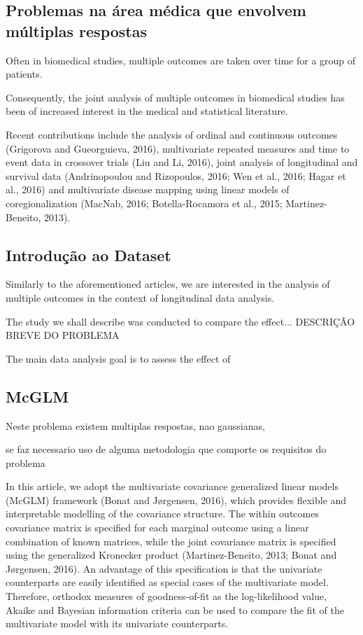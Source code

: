 \documentclass[AMA,STIX1COL]{WileyNJD-v2}
\begin{document}
\subsection{Problemas na área médica que envolvem múltiplas respostas}

Often in biomedical studies, multiple outcomes are taken over time for a group of patients. 

Consequently, the joint analysis of multiple outcomes in biomedical studies has been of increased interest in the medical and statistical literature. 

Recent contributions include the analysis of ordinal and continuous outcomes (Grigorova and Gueorguieva, 2016), multivariate repeated measures and time to event data in crossover trials (Liu and Li, 2016), joint analysis of longitudinal and survival data (Andrinopoulou and Rizopoulos, 2016; Wen et al., 2016; Hagar et al., 2016) and multivariate disease mapping using linear models of coregionalization (MacNab, 2016; Botella-Rocamora et al., 2015; Martinez-Beneito, 2013).

\subsection{Introdução ao Dataset}

Similarly to the aforementioned articles, we are interested in the analysis of multiple outcomes in the context of longitudinal data analysis. 

The study we shall describe was conducted to compare the effect... DESCRIÇÃO BREVE DO PROBLEMA

The main data analysis goal is to assess the effect of 

\subsection{McGLM}

Neste problema existem multiplas respostas, nao gaussianas, 

se faz necessario uso de alguma metodologia que comporte os requisitos do problema

In this article, we adopt the multivariate covariance generalized linear models (McGLM) framework (Bonat and Jørgensen, 2016), which provides flexible and interpretable modelling of the covariance structure. The within outcomes covariance matrix is specified for each marginal outcome using a linear combination of known matrices, while the joint covariance matrix is specified using the generalized Kronecker product (Martinez-Beneito, 2013; Bonat and Jørgensen, 2016). An advantage of this specification is that the univariate counterparts are easily identified as special cases of the multivariate model. Therefore, orthodox measures of goodness-of-fit as the log-likelihood value, Akaike and Bayesian information criteria can be used to compare the fit of the multivariate model with its univariate counterparts.
\end{document}
